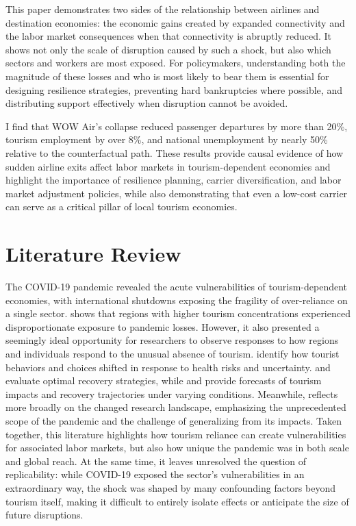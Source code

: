 \documentclass[12pt]{article}
\begin{document}
This paper demonstrates two sides of the relationship between airlines and destination economies: the economic gains created by expanded connectivity and the labor market consequences when that connectivity is abruptly reduced. It shows not only the scale of disruption caused by such a shock, but also which sectors and workers are most exposed. For policymakers, understanding both the magnitude of these losses and who is most likely to bear them is essential for designing resilience strategies, preventing hard bankruptcies where possible, and distributing support effectively when disruption cannot be avoided.

I find that WOW Air’s collapse reduced passenger departures by more than 20\%, tourism employment by over 8\%, and national unemployment by nearly 50\% relative to the counterfactual path. These results provide causal evidence of how sudden airline exits affect labor markets in tourism-dependent economies and highlight the importance of resilience planning, carrier diversification, and labor market adjustment policies, while also demonstrating that even a low-cost carrier can serve as a critical pillar of local tourism economies.

\section{Literature Review}\label{sec:Literature}
The COVID-19 pandemic revealed the acute vulnerabilities of tourism-dependent economies, with international shutdowns exposing the fragility of over-reliance on a single sector. \citet{duro_2021_covid19} shows that regions with higher tourism concentrations experienced disproportionate exposure to pandemic losses. However, it also presented a seemingly ideal opportunity for researchers to observe responses to how regions and individuals respond to the unusual absence of tourism.  \citet{jczmyk_2023_impact} identify how tourist behaviors and choices shifted in response to health risks and uncertainty. \citet{yeh_2020_tourism} and \citet{kreiner_2020_national} evaluate optimal recovery strategies, while \citet{fotiadis_2021_the} and \citet{kare_2020_impact} provide forecasts of tourism impacts and recovery trajectories under varying conditions. Meanwhile, \citet{sigala_2020_tourism} reflects more broadly on the changed research landscape, emphasizing the unprecedented scope of the pandemic and the challenge of generalizing from its impacts. Taken together, this literature highlights how tourism reliance can create vulnerabilities for associated labor markets, but also how unique the pandemic was in both scale and global reach. At the same time, it leaves unresolved the question of replicability: while COVID-19 exposed the sector’s vulnerabilities in an extraordinary way, the shock was shaped by many confounding factors beyond tourism itself, making it difficult to entirely isolate effects or anticipate the size of future disruptions.
\end{document}

